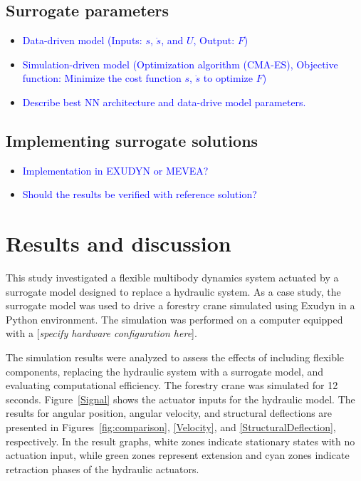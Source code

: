 \subsection{Surrogate parameters}
\begin{itemize}   
    \item \textcolor{blue}{Data-driven model (Inputs: $s$, $\dot{s}$, and $U$, Output: $F$)}

    \item \textcolor{blue}{Simulation-driven model (Optimization algorithm (CMA-ES), Objective function: Minimize the cost function $s$, $\dot{s}$ to optimize $F$)}

     \item \textcolor{blue}{Describe best NN architecture and data-drive model parameters. } 
\end{itemize}
\subsection{Implementing surrogate solutions}
\begin{itemize}   
     \item \textcolor{blue}{Implementation  in EXUDYN or MEVEA? }

    \item \textcolor{blue}{Should the results be verified with reference solution? }    
\end{itemize}
\section{Results and discussion}

This study investigated a flexible multibody dynamics system actuated by a surrogate model designed to replace a hydraulic system. As a case study, the surrogate model was used to drive a forestry crane simulated using Exudyn in a Python environment. The simulation was performed on a computer equipped with a [\textit{specify hardware configuration here}]. 

The simulation results were analyzed to assess the effects of including flexible components, replacing the hydraulic system with a surrogate model, and evaluating computational efficiency. The forestry crane was simulated for 12 seconds. Figure~\ref{Signal} shows the actuator inputs for the hydraulic model. The results for angular position, angular velocity, and structural deflections are presented in Figures~\ref{fig:comparison}, \ref{Velocity}, and \ref{StructuralDeflection}, respectively. In the result graphs, white zones indicate stationary states with no actuation input, while green zones represent extension and cyan zones indicate retraction phases of the hydraulic actuators.


